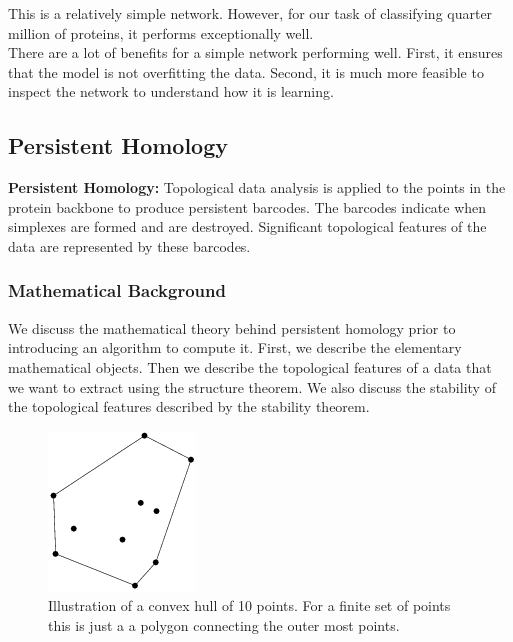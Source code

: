 \documentclass[12pt, a4paper, twocolumn, fullpage]{article}
\theoremstyle{plain}
\theoremstyle{definition}
\theoremstyle{remark}
\begin{document}
This is a relatively simple network. However, for our task of classifying quarter million of proteins, it performs exceptionally well. 
\\
There are a lot of benefits for a simple network performing well. First, it ensures that the model is not overfitting the data. Second, it is much more feasible to inspect the network to understand how it is learning.


\subsection{ Persistent Homology}
\textbf{Persistent Homology: } Topological data analysis is applied to the points in the protein backbone to produce persistent barcodes. The barcodes indicate when simplexes are formed and are destroyed. Significant topological features of the data are represented by these barcodes.


\subsubsection{ Mathematical Background}

We discuss the mathematical theory behind persistent homology prior to introducing an algorithm to compute it.  First, we describe the elementary mathematical objects. Then we describe the topological features of a data that we want to extract using the structure theorem. We also discuss the stability of the topological features described by the stability theorem.

\begin{figure}[t]
\centering
    \includegraphics[width=.6\linewidth]{img/mathDef/ConvexHull2D}
    \caption{Illustration of a convex hull of 10 points. For a finite set of points this is just a a polygon connecting the outer most points.}
    \label{ConvexHull}
\end{figure}
\end{document}
